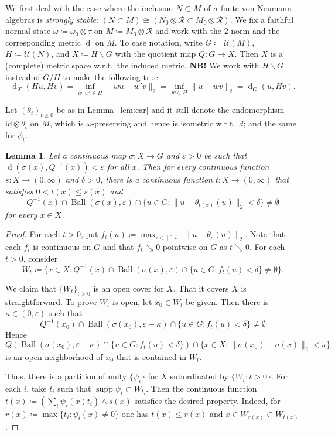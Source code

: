 \documentclass[12pt,nosumlimits,nonamelimits]{amsart}
\newtheorem{lem}[thm]{Lemma}
\theoremstyle{remark}
\newcommand{\cR}{\mathcal{R}}
\newcommand{\cU}{\mathcal{U}}
\newcommand{\ve}{\varepsilon}
\newcommand{\id}{\mathrm{id}}
\DeclareMathOperator{\supp}{supp}
\DeclareMathOperator{\dist}{d}
\DeclareMathOperator{\Ball}{Ball}
\begin{document}
We first deal with the case where the inclusion 
$N\subset M$ of $\sigma$-finite 
von Neumann algebras is \emph{strongly stable}: 
$(N\subset M)\cong (N_0\otimes\cR\subset M_0\otimes\cR)$. 
We fix a faithful normal state 
$\omega\coloneqq\omega_0\otimes\tau$ on $M\coloneqq M_0\otimes\cR$ and 
work with the $2$-norm and the corresponding metric 
$\dist$ on $M$. 
To ease notation, write $G\coloneqq\cU(M)$, $H\coloneqq\cU(N)$, 
and $X\coloneqq H\backslash G$ with the quotient map $Q\colon G\to X$. 
Then $X$ is a (complete) metric space 
w.r.t.\ the induced metric. 
\textbf{NB!} We work with $H\backslash G$ instead of $G/H$ 
to make the following true:
\[
\dist_X(Hu,Hv)=\inf_{w,w'\in H}\|wu-w'v\|_2=\inf_{w\in H}\|u-wv\|_2=\dist_G(u, Hv).
\]

Let $(\theta_t)_{t\geq0}$ be as in Lemma~\ref{lem:car} 
and it still denote the endomorphism $\id\otimes\theta_t$ 
on $M$, which is $\omega$-preserving and hence is isometric w.r.t.\ $d$; 
and the same for $\phi_t$. 
\begin{lem}\label{lem:selection3}
Let a continuous map $\sigma\colon X\to G$ 
and $\ve>0$ be such that 
$\dist(\sigma(x),Q^{-1}(x))<\ve$ for all $x$. 
Then for every continuous function $s\colon X\to(0,\infty)$ 
and $\delta>0$, 
there is a continuous function $t\colon X\to (0,\infty)$ 
that satisfies $0<t(x)\le s(x)$ and 
\[
Q^{-1}(x)\cap\Ball(\sigma(x),\ve)
 \cap \{ u\in G : \| u - \theta_{t(x)}(u) \|_2<\delta\}
 \neq \emptyset
\]
for every $x\in X$.
\end{lem}
\begin{proof}
For each $t>0$, put $f_t(u)\coloneqq\max_{s\in[0,t]}\| u - \theta_s(u)\|_2$. 
Note that each $f_t$ is continuous on $G$ and that 
$f_t\searrow0$ pointwise on $G$ as $t\searrow0$.  
For each $t>0$, consider
\[
W_t\coloneqq\{ x\in X : Q^{-1}(x)\cap\Ball(\sigma(x),\ve)\cap\{ u\in G : f_t(u)<\delta\}
 \neq \emptyset \}.
\]

We claim that $\{ W_t \}_{t>0}$ is an open cover for $X$. 
That it covers $X$ is straightforward. 
To prove $W_t$ is open, let $x_0\in W_t$ be given. 
Then there is $\kappa\in (0,\ve)$ such that 
\[
Q^{-1}(x_0)\cap\Ball(\sigma(x_0),\ve-\kappa)\cap\{ u\in G : f_t(u)<\delta\}
 \neq \emptyset
\]
Hence
\[
Q(\Ball(\sigma(x_0),\ve-\kappa)\cap\{ u\in G : f_t(u)<\delta\})\cap\{ x\in X : \|\sigma(x_0)-\sigma(x)\|_2<\kappa\}
\]
is an open neighborhood of $x_0$ that is contained in $W_t$. 

Thus, there is a partition of unity $\{\psi_i\}$ for $X$ 
subordinated by $\{ W_t : t>0\}$.
For each $i$, take $t_i$ such that $\supp\psi_i\subset W_{t_i}$. 
Then the continuous function $t(x)\coloneqq(\sum_i \psi_i(x)t_i)\wedge s(x)$ satisfies the desired property. 
Indeed, for $r(x)\coloneqq\max\{ t_i : \psi_i(x)\neq0\}$ 
one has $t(x) \le r(x)$ and $x\in W_{r(x)}\subset W_{t(x)}$. 
\end{proof}
\end{document}
